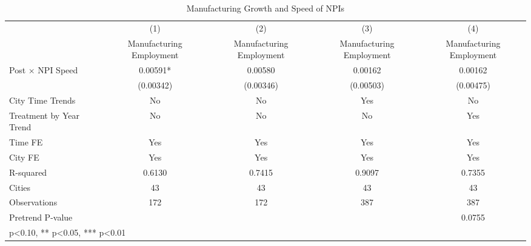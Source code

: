 \begin{table}[htbp]\centering
\def\sym#1{\ifmmode^{#1}\else\(^{#1}\)\fi}
\caption{Manufacturing Growth and Speed of NPIs}
\begin{tabular}{l*{4}{c}}
\hline\hline
                    &\multicolumn{1}{c}{(1)}   &\multicolumn{1}{c}{(2)}   &\multicolumn{1}{c}{(3)}   &\multicolumn{1}{c}{(4)}   \\
                    &Manufacturing Employment   &Manufacturing Employment   &Manufacturing Employment   &Manufacturing Employment   \\
\hline
Post $\times$ NPI Speed&     0.00591*  &     0.00580   &     0.00162   &     0.00162   \\
                    &   (0.00342)   &   (0.00346)   &   (0.00503)   &   (0.00475)   \\
City Time Trends    &          No   &          No   &         Yes   &          No   \\
Treatment by Year Trend &          No   &          No   &          No   &         Yes   \\
Time FE             &         Yes   &         Yes   &         Yes   &         Yes   \\
\hline
City FE             &         Yes   &         Yes   &         Yes   &         Yes   \\
R-squared           &      0.6130   &      0.7415   &      0.9097   &      0.7355   \\
Cities              &          43   &          43   &          43   &          43   \\
Observations        &         172   &         172   &         387   &         387   \\
Pretrend P-value    &               &               &               &      0.0755   \\
\hline\hline
\multicolumn{5}{l}{\footnotesize * p<0.10, ** p<0.05, *** p<0.01}\\
\end{tabular}
\end{table}
